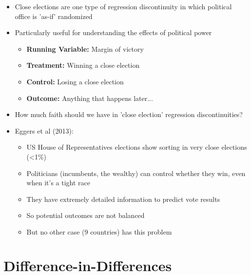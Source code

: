 \documentclass[xcolor=x11names,compress]{beamer}\usepackage[]{graphicx}\usepackage[]{color}
\renewcommand{\(}{\begin{columns}}
\renewcommand{\)}{\end{columns}}
\newcommand{\<}[1]{\begin{column}{#1}}
\renewcommand{\>}{\end{column}}
\begin{document}
\begin{frame}
\begin{itemize}
\item Close elections are one type of regression discontinuity in which political office is 'as-if' randomized
\pause
\item Particularly useful for understanding the effects of political power
\pause
\begin{itemize}
\item \textbf{Running Variable: }Margin of victory
\item \textbf{Treatment: }Winning a close election
\item \textbf{Control: }Losing a close election
\item \textbf{Outcome: }Anything that happens later...
\end{itemize}
\end{itemize}
\end{frame}

\begin{frame}
\begin{itemize}
\item How much faith should we have in 'close election' regression discontinuities?
\pause
\item Eggers et al (2013):
\pause
\begin{itemize}
\item US House of Representatives elections show sorting in very close elections (<1\%)
\pause
\item Politicians (incumbents, the wealthy) can control whether they win, even when it's a tight race
\pause
\item They have extremely detailed information to predict vote results
\pause
\item So potential outcomes are not balanced
\pause
\item But no other case (9 countries) has this problem
\end{itemize}
\end{itemize}
\end{frame}



\section{Difference-in-Differences}
\end{document}
